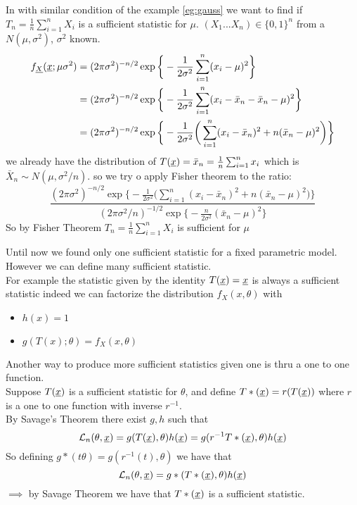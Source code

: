 \begin{eg}In with similar condition of the example \ref{eg:gauss} we want to find if $T_n=\frac{1}{n}\sum_{i=1}^{n} X_i$ is a sufficient statistic for $\mu$.
	$(X_1... X_n)\in \{0,1\}^n$ from a $N(\mu,\sigma^2)$, $\sigma^2$ known.
	\[
	\begin{split}
	f_{\underline X}(\underline x;\mu\sigma^2)
	&=(2 \pi \sigma^2)^{-n/2} \exp \bigg\{ -\frac{1}{2\sigma^2}\sum_{i=1}^{n} (x_i-\mu)^2 \bigg\}\\
	&=(2 \pi \sigma^2)^{-n/2} \exp \bigg\{ -\frac{1}{2\sigma^2} \sum_{i=1}^{n}(x_i-\bar x_n -\bar x_n -\mu)^2 \bigg\}\\
	&=(2 \pi \sigma^2)^{-n/2} \exp \bigg\{ -\frac{1}{2\sigma^2}\bigg( \sum_{i=1}^{n} (x_i-\bar x_n)^2 + n(\bar x_n-\mu)^2  \bigg) \bigg\}\\
	\end{split}
	\]
	we already have the distribution of $T(\underline x)=\bar x_n=\frac{1}{n}\sum_{i=1}^{n}x_i$ which is $\bar X_n\sim N(\mu,\sigma^2/n)$.
	so we try o apply Fisher theorem to the ratio:
	\[
	\frac{(2 \pi \sigma^2)^{-n/2} \exp \bigg\{ -\frac{1}{2\sigma^2}\bigg( \sum_{i=1}^{n} (x_i-\bar x_n)^2 + n(\bar x_n-\mu)^2  \bigg) \bigg\}}{(2 \pi \sigma^2/n)^{-1/2}\exp \bigg\{- \frac{n}{2\sigma^2} (\bar x_n -\mu)^2 \bigg\}}
	\]
	So by Fisher Theorem $T_n=\frac{1}{n}\sum_{i=1}^{n} X_i$ is sufficient for $\mu$
\end{eg}
\begin{oss}
	Until now we found only one sufficient statistic for a fixed parametric model. However we can define many sufficient statistic.\\
	For example the statistic given by the identity $T(\underline x)=\underline x$ is always a sufficient statistic indeed we can factorize the distribution $f_X(x,\theta)$ with
	\begin{itemize}
		\item $h(x)=1$
		\item $g(T(x);\theta)=f_X(x,\theta)$
	\end{itemize}


Another  way to produce more sufficient statistics given one is thru a one to one function.\\
Suppose $T(\underline x)$ is a sufficient statistic for $\theta$, and define $T*(\underline x)=r(T(\underline x))$ where $r$ is a one to one function with inverse $r^{-1}$.\\
By Savage's Theorem there exist $g,h$ such that
$$\mathcal{L}_n(\theta,\underline x)=g(T(\underline x),\theta)h(\underline x)=g(r^{-1}T*(\underline x),\theta)h(\underline x)$$
So defining $g*(t\theta)=g(r^{-1}(t),\theta)$ we have that
$$\mathcal{L}_n(\theta,\underline x)=g*(T*(\underline x),\theta)h(\underline x)$$
$\implies$ by Savage Theorem we have that $T*(\underline x)$ is a sufficient statistic.
\end{oss}
